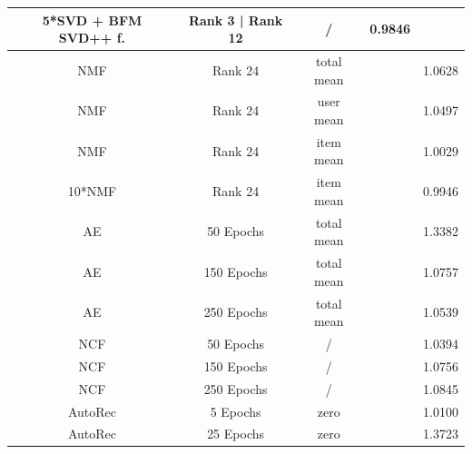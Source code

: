 \documentclass[10pt,conference,compsocconf]{IEEEtran}
\begin{document}
\begin{table}
{\begin{tabular}{|| c | c | c | c | c ||}
                5*SVD + BFM SVD++ f. & Rank 3 | Rank 12                      & /                       & 0.9846                 &                         \\
                \hline
                NMF                  & Rank 24                               & total mean              &                        & 1.0628                  \\
                NMF                  & Rank 24                               & user mean               &                        & 1.0497                  \\
                NMF                  & Rank 24                               & item mean               &                        & 1.0029                  \\
                10*NMF               & Rank 24                               & item mean               &                        & 0.9946                  \\
                \hline
                AE                   & 50 Epochs                             & total mean              &                        & 1.3382                  \\
                AE                   & 150 Epochs                            & total mean              &                        & 1.0757                  \\
                AE                   & 250 Epochs                            & total mean              &                        & 1.0539                  \\
                \hline
                NCF                  & 50 Epochs                             & /                       &                        & 1.0394                  \\
                NCF                  & 150 Epochs                            & /                       &                        & 1.0756                  \\
                NCF                  & 250 Epochs                            & /                       &                        & 1.0845                  \\
                \hline
                AutoRec              & 5 Epochs                              & zero                    &                        & 1.0100                  \\
                AutoRec              & 25 Epochs                             & zero                    &                        & 1.3723                  \\

\end{tabular}}
\end{table}
\end{document}
